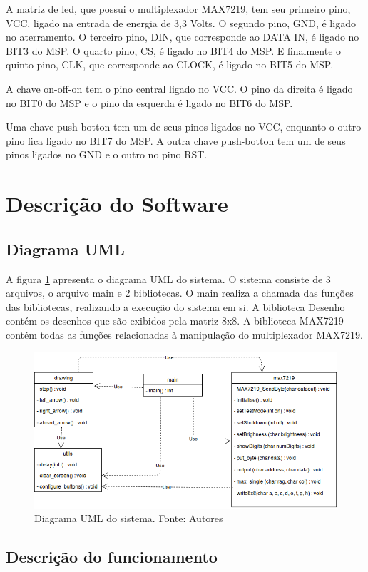 \documentclass[conference]{IEEEtran}
\begin{document}
A matriz de led, que possui o multiplexador MAX7219, tem seu primeiro pino, VCC, ligado na entrada de energia de 3,3 Volts. O segundo pino, GND, é ligado no aterramento. O terceiro pino, DIN, que corresponde ao DATA IN, é ligado no BIT3 do MSP. O quarto pino, CS, é ligado no BIT4 do MSP. E finalmente o quinto pino, CLK, que corresponde ao CLOCK, é ligado no BIT5 do MSP. 

A chave on-off-on tem o pino central ligado no VCC. O pino da direita é ligado no BIT0 do MSP e o pino da esquerda é ligado no BIT6 do MSP. 

Uma chave push-botton tem um de seus pinos ligados no VCC, enquanto o outro pino fica ligado no BIT7 do MSP. A outra chave push-botton tem um de seus pinos ligados no GND e o outro no pino RST.

\section{Descrição do Software}
\subsection{Diagrama UML}
A figura \ref{fig:uml} apresenta o diagrama UML do sistema. O sistema consiste de 3 arquivos, o arquivo main e 2 bibliotecas. O main realiza a chamada das funções das bibliotecas, realizando a execução do sistema em si. A biblioteca Desenho contém os desenhos que são exibidos pela matriz 8x8. A biblioteca MAX7219 contém todas as funções relacionadas à manipulação do multiplexador MAX7219. 

\begin{figure}[H]
  \centering
  \includegraphics[width=0.9\linewidth]{uml}
  \caption{Diagrama UML do sistema. Fonte: Autores}
  \label{fig:uml}
\end{figure}

\subsection{Descrição do funcionamento}
\end{document}
